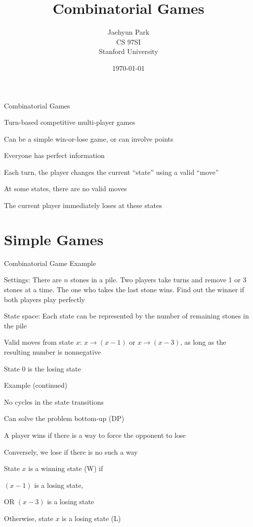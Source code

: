 \documentclass[13pt,onlymath]{beamer}
\title{\large \bfseries Combinatorial Games}
\author{Jaehyun Park\\[3ex]
CS 97SI\\
Stanford University}
\date{\today}
\begin{document}
\frame{
\thispagestyle{empty}
\titlepage
}

\begin{frame}{Combinatorial Games}
\BIT
\item Turn-based competitive multi-player games
\item Can be a simple win-or-lose game, or can involve points
\item Everyone has perfect information
\item Each turn, the player changes the current ``state'' using a valid ``move''
\item At some states, there are no valid moves
\BIT
\item The current player immediately loses at these states
\EIT
\EIT
\end{frame}


\section{Simple Games}

\begin{frame}{Combinatorial Game Example}
\BIT
\item Settings: There are $n$ stones in a pile. Two players take turns and remove 1 or 3 stones at a time. The one who takes the last stone wins. Find out the winner if both players play perfectly
\item State space: Each state can be represented by the number of remaining stones in the pile
\item Valid moves from state $x$: $x \rightarrow (x-1)$ or $x \rightarrow (x-3)$, as long as the resulting number is nonnegative
\item State 0 is the losing state
\EIT
\end{frame}

\begin{frame}{Example (continued)}
\BIT
\item No cycles in the state transitions
\BIT
\item Can solve the problem bottom-up (DP)
\EIT
\item A player wins if there is a way to force the opponent to lose
\BIT
\item Conversely, we lose if there is no such a way
\EIT
\item State $x$ is a winning state (W) if
\BIT
\item $(x-1)$ is a losing state,
\item OR $(x-3)$ is a losing state
\EIT
\item Otherwise, state $x$ is a losing state (L)
\EIT
\end{frame}
\end{document}
